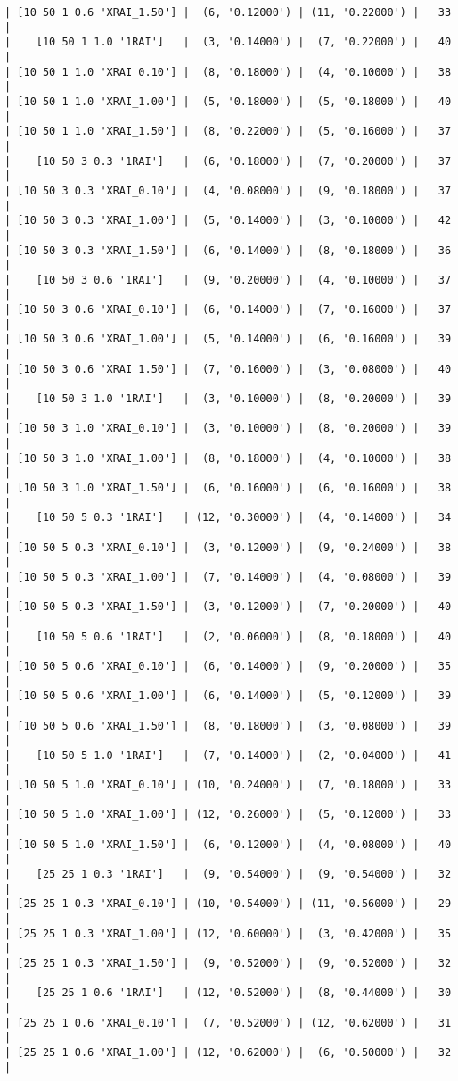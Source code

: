 \documentclass{article}
\begin{document}
\begin{verbatim}
| [10 50 1 0.6 'XRAI_1.50'] |  (6, '0.12000') | (11, '0.22000') |   33  |
|    [10 50 1 1.0 '1RAI']   |  (3, '0.14000') |  (7, '0.22000') |   40  |
| [10 50 1 1.0 'XRAI_0.10'] |  (8, '0.18000') |  (4, '0.10000') |   38  |
| [10 50 1 1.0 'XRAI_1.00'] |  (5, '0.18000') |  (5, '0.18000') |   40  |
| [10 50 1 1.0 'XRAI_1.50'] |  (8, '0.22000') |  (5, '0.16000') |   37  |
|    [10 50 3 0.3 '1RAI']   |  (6, '0.18000') |  (7, '0.20000') |   37  |
| [10 50 3 0.3 'XRAI_0.10'] |  (4, '0.08000') |  (9, '0.18000') |   37  |
| [10 50 3 0.3 'XRAI_1.00'] |  (5, '0.14000') |  (3, '0.10000') |   42  |
| [10 50 3 0.3 'XRAI_1.50'] |  (6, '0.14000') |  (8, '0.18000') |   36  |
|    [10 50 3 0.6 '1RAI']   |  (9, '0.20000') |  (4, '0.10000') |   37  |
| [10 50 3 0.6 'XRAI_0.10'] |  (6, '0.14000') |  (7, '0.16000') |   37  |
| [10 50 3 0.6 'XRAI_1.00'] |  (5, '0.14000') |  (6, '0.16000') |   39  |
| [10 50 3 0.6 'XRAI_1.50'] |  (7, '0.16000') |  (3, '0.08000') |   40  |
|    [10 50 3 1.0 '1RAI']   |  (3, '0.10000') |  (8, '0.20000') |   39  |
| [10 50 3 1.0 'XRAI_0.10'] |  (3, '0.10000') |  (8, '0.20000') |   39  |
| [10 50 3 1.0 'XRAI_1.00'] |  (8, '0.18000') |  (4, '0.10000') |   38  |
| [10 50 3 1.0 'XRAI_1.50'] |  (6, '0.16000') |  (6, '0.16000') |   38  |
|    [10 50 5 0.3 '1RAI']   | (12, '0.30000') |  (4, '0.14000') |   34  |
| [10 50 5 0.3 'XRAI_0.10'] |  (3, '0.12000') |  (9, '0.24000') |   38  |
| [10 50 5 0.3 'XRAI_1.00'] |  (7, '0.14000') |  (4, '0.08000') |   39  |
| [10 50 5 0.3 'XRAI_1.50'] |  (3, '0.12000') |  (7, '0.20000') |   40  |
|    [10 50 5 0.6 '1RAI']   |  (2, '0.06000') |  (8, '0.18000') |   40  |
| [10 50 5 0.6 'XRAI_0.10'] |  (6, '0.14000') |  (9, '0.20000') |   35  |
| [10 50 5 0.6 'XRAI_1.00'] |  (6, '0.14000') |  (5, '0.12000') |   39  |
| [10 50 5 0.6 'XRAI_1.50'] |  (8, '0.18000') |  (3, '0.08000') |   39  |
|    [10 50 5 1.0 '1RAI']   |  (7, '0.14000') |  (2, '0.04000') |   41  |
| [10 50 5 1.0 'XRAI_0.10'] | (10, '0.24000') |  (7, '0.18000') |   33  |
| [10 50 5 1.0 'XRAI_1.00'] | (12, '0.26000') |  (5, '0.12000') |   33  |
| [10 50 5 1.0 'XRAI_1.50'] |  (6, '0.12000') |  (4, '0.08000') |   40  |
|    [25 25 1 0.3 '1RAI']   |  (9, '0.54000') |  (9, '0.54000') |   32  |
| [25 25 1 0.3 'XRAI_0.10'] | (10, '0.54000') | (11, '0.56000') |   29  |
| [25 25 1 0.3 'XRAI_1.00'] | (12, '0.60000') |  (3, '0.42000') |   35  |
| [25 25 1 0.3 'XRAI_1.50'] |  (9, '0.52000') |  (9, '0.52000') |   32  |
|    [25 25 1 0.6 '1RAI']   | (12, '0.52000') |  (8, '0.44000') |   30  |
| [25 25 1 0.6 'XRAI_0.10'] |  (7, '0.52000') | (12, '0.62000') |   31  |
| [25 25 1 0.6 'XRAI_1.00'] | (12, '0.62000') |  (6, '0.50000') |   32  |

\end{verbatim}
\end{document}
